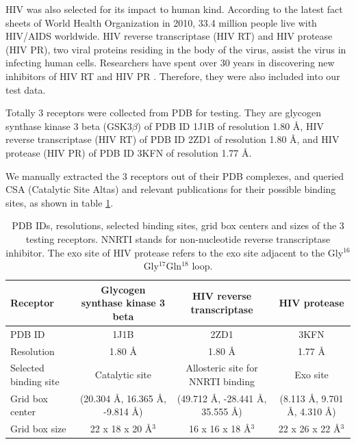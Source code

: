 \documentclass[10pt,conference,letterpaper]{IEEEtran}
\begin{document}
HIV was also selected for its impact to human kind. According to the latest fact sheets of World Health Organization in 2010, 33.4 million people live with HIV/AIDS worldwide.
HIV reverse transcriptase (HIV RT) and HIV protease (HIV PR), two viral proteins residing in the body of the virus, assist the virus in infecting human cells.
Researchers have spent over 30 years in discovering new inhibitors of HIV RT and HIV PR \cite{RefWorks:221,RefWorks:222,RefWorks:223}.
Therefore, they were also included into our test data.

Totally 3 receptors were collected from PDB \cite{RefWorks:96} for testing.
They are glycogen synthase kinase 3 beta (GSK3$\beta$) of PDB ID 1J1B \cite{RefWorks:245} of resolution 1.80 \AA, HIV reverse transcriptase (HIV RT) of PDB ID 2ZD1 \cite{RefWorks:180} of resolution 1.80 \AA, and HIV protease (HIV PR) of PDB ID 3KFN \cite{RefWorks:243} of resolution 1.77 \AA.

We manually extracted the 3 receptors out of their PDB complexes, and queried CSA (Catalytic Site Altas) \cite{RefWorks:206} and relevant publications \cite{RefWorks:245,RefWorks:246,RefWorks:180,RefWorks:221,RefWorks:222,RefWorks:223,RefWorks:243} for their possible binding sites, as shown in table \ref{tab:searchspace}.

\begin{table}
\centering
\begin{tabular}
{lccc}
\noalign{\smallskip}\toprule
Receptor & Glycogen synthase kinase 3 beta & HIV reverse transcriptase & HIV protease\\
\midrule
\noalign{\smallskip}
PDB ID & 1J1B & 2ZD1 & 3KFN\\
Resolution & 1.80 \AA & 1.80 \AA & 1.77 \AA\\
Selected binding site & Catalytic site & Allosteric site for NNRTI binding & Exo site\\
Grid box center & (20.304 \AA, 16.365 \AA, -9.814 \AA) & (49.712 \AA, -28.441 \AA, 35.555 \AA) & (8.113 \AA, 9.701 \AA, 4.310 \AA) \\
Grid box size & 22 x 18 x 20 \AA$^3$ & 16 x 16 x 18 \AA$^3$ & 22 x 26 x 22 \AA$^3$\\
\bottomrule
\end{tabular}
\caption{PDB IDs, resolutions, selected binding sites, grid box centers and sizes of the 3 testing receptors. NNRTI stands for non-nucleotide reverse transcriptase inhibitor. The exo site of HIV protease refers to the exo site adjacent to the Gly$^{16}$Gly$^{17}$Gln$^{18}$ loop.}
\label{tab:searchspace}
\end{table}
\end{document}
